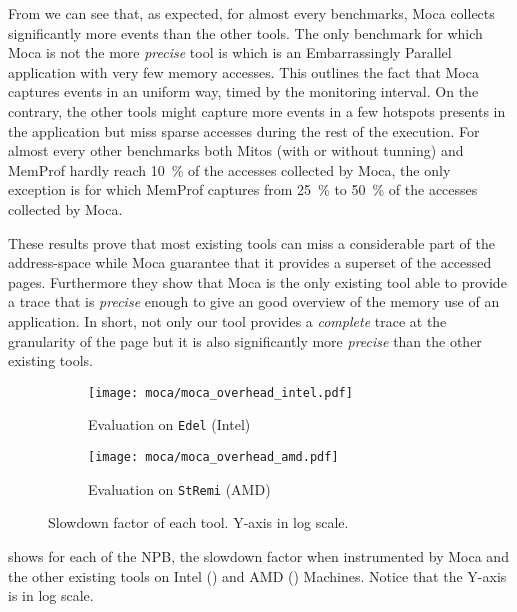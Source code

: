 From  we can see that, as expected, for almost every benchmarks,
\gls{Moca} collects significantly more events than the other tools.  The only
benchmark for which \gls{Moca} is not the more \emph{precise} tool is \EP which is an
Embarrassingly Parallel application with very few memory accesses.
This outlines the fact that \gls{Moca} captures events in an uniform way, timed by the monitoring interval.
On the contrary, the other tools might capture more events in a few hotspots presents in the application but miss
sparse accesses during the rest of the execution.
For almost
every other benchmarks both \gls{Mitos} (with or without tunning) and \gls{MemProf}
hardly reach \SI{10}{\%} of the accesses collected by \gls{Moca}, the only exception is
\DC for which \gls{MemProf} captures from \SI{25}{\%} to \SI{50}{\%} of the accesses
collected by \gls{Moca}.

These results prove that most existing tools can miss a considerable part of
the address-space while \gls{Moca} guarantee that it provides a superset of the accessed
pages. Furthermore they show that \gls{Moca} is the only existing tool able to provide a
trace that is \emph{precise} enough to give an good overview of the memory use of an application. In
short, not only our tool provides a \emph{complete} trace at the granularity of the
page but it is also significantly more \emph{precise} than the other existing tools.

\begin{figure}[htb]
    \centering
    \begin{subfigure}{.49\linewidth}
        \texttt{[image: moca/moca\_overhead\_intel.pdf]}
        \caption{Evaluation on \texttt{Edel} (Intel)}
        \label{fig:ovh-Intel}
    \end{subfigure}
    \begin{subfigure}{.49\linewidth}
        \texttt{[image: moca/moca\_overhead\_amd.pdf]}
        \caption{Evaluation on \texttt{StRemi} (AMD)}
        \label{fig:ovh-AMD}
    \end{subfigure}
    \caption[Slowdown factor of each tool.]{Slowdown factor of each tool.
    Y-axis in log scale.}
    \label{fig:ovh}
\end{figure}

 shows for each of the \gls{NPB}, the slowdown factor when
instrumented by \gls{Moca} and the other existing tools on Intel
() and AMD () Machines. Notice that the Y-axis is in
log scale.

